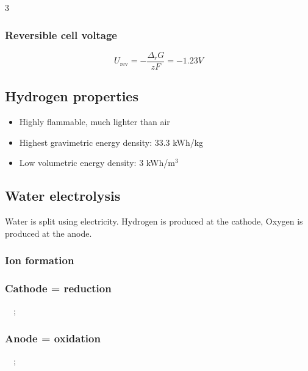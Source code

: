 \documentclass[9pt, landscape, a4paper]{article}
\begin{document}
\begin{multicols*}{3}
\subsubsection{Reversible cell voltage}
\[U_\text{rev} = -\frac{\Delta_r G}{zF} = -1.23 V\]

\subsection{Hydrogen properties}
\begin{itemize}
  \item Highly flammable, much lighter than air
  \item Highest gravimetric energy density: 33.3 kWh/kg
  \item Low volumetric energy density: 3 kWh/m$^3$
\end{itemize}

\subsection{Water electrolysis}
Water is split using electricity. Hydrogen is produced at the cathode,
Oxygen is produced at the anode.

\subsubsection{Ion formation}
\begin{center}
\end{center}

\subsubsection{Cathode = reduction}
\begin{center}
  $\quad ; \quad$
\end{center}

\subsubsection{Anode = oxidation}
\begin{center}
  $\quad ; \quad$
\end{center}


\end{multicols*}
\end{document}
